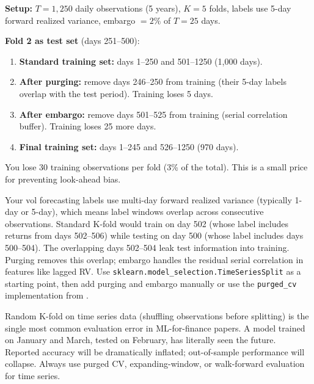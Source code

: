 \begin{workedexample}
\textbf{Setup:} $T = 1{,}250$ daily observations (5 years), $K = 5$ folds, labels use 5-day forward realized variance, embargo $= 2\%$ of $T = 25$ days.

\textbf{Fold 2 as test set} (days 251--500):
\begin{enumerate}[nosep]
  \item \textbf{Standard training set:} days 1--250 and 501--1250 (1,000 days).
  \item \textbf{After purging:} remove days 246--250 from training (their 5-day labels overlap with the test period). Training loses 5 days.
  \item \textbf{After embargo:} remove days 501--525 from training (serial correlation buffer). Training loses 25 more days.
  \item \textbf{Final training set:} days 1--245 and 526--1250 (970 days).
\end{enumerate}

You lose 30 training observations per fold (3\% of the total). This is a small price for preventing look-ahead bias.
\end{workedexample}

\begin{projectconnection}
Your vol forecasting labels use multi-day forward realized variance (typically 1-day or 5-day), which means label windows overlap across consecutive observations.
Standard K-fold would train on day 502 (whose label includes returns from days 502--506) while testing on day 500 (whose label includes days 500--504).
The overlapping days 502--504 leak test information into training.
Purging removes this overlap; embargo handles the residual serial correlation in features like lagged RV.
Use \texttt{sklearn.model\_selection.TimeSeriesSplit} as a starting point, then add purging and embargo manually or use the \texttt{purged\_cv} implementation from \citet{LopezdePrado2018}.
\end{projectconnection}

\begin{warning}
Random K-fold on time series data (shuffling observations before splitting) is the single most common evaluation error in ML-for-finance papers.
A model trained on January and March, tested on February, has literally seen the future.
Reported accuracy will be dramatically inflated; out-of-sample performance will collapse.
Always use purged CV, expanding-window, or walk-forward evaluation for time series.
\end{warning}



